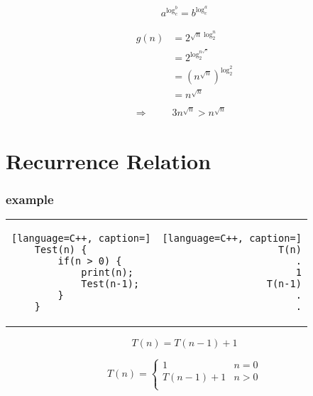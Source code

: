 \documentclass[12pt]{article}
\begin{document}
\begin{tcolorbox}
\LARGE
\begin{align*}
a^{\log^{b}_{c}} = b^{\log^{a}_{c}}
\end{align*}
\end{tcolorbox}


{
\LARGE
\begin{align*}
g(n) &= 2^{\sqrt{n}\log^{n}_{2}} \\
&= 2^{\log^{n^{\sqrt{n}}}_{2}} \\
&= (n^{\sqrt{n}})^{\log^{2}_{2}} \\
&= n^{\sqrt{n}} \\
\\
\Rightarrow \quad &3 n^{\sqrt{n}} > n^{\sqrt{n}} 
\end{align*}
}



\newpage

\section{Recurrence Relation}


\subsubsection{example}


\begin{center}
  \bgroup
  \def\arraystretch{1.5}%
  \begin{tabular}{ E  D  }
	\begin{lstlisting}[language=C++, caption=]
	Test(n) {
		if(n > 0) {
			print(n);
			Test(n-1);
		}
	}
	\end{lstlisting}
     &  
	\begin{lstlisting}[language=C++, caption=]
	T(n)
	.
	1
	T(n-1)
	.
	.
	\end{lstlisting}
  \end{tabular}
  \egroup
\end{center}



$$
T(n) = T(n-1) + 1
$$



$$
T(n) = \begin{cases}
1  &n = 0 \\
T(n-1) + 1  &n > 0 \\
\end{cases}
$$
\end{document}
